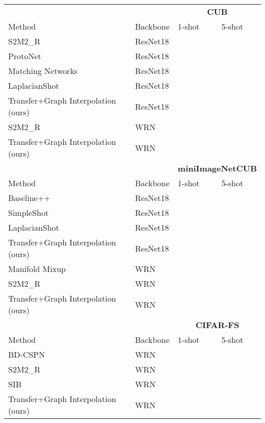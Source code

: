 \documentclass[a4paper,conference]{IEEEtran}
\begin{document}
\begin{table*}
{\begin{tabular}{l|l|l|l}
         \toprule
         &          & \multicolumn{2}{c}{\textbf{CUB}} \\
         Method & Backbone & 1-shot & 5-shot \\       
         \midrule
S2M2\_R~\cite{mangla2020charting} & ResNet18 &  & \\
         ProtoNet~\cite{snell2017prototypical} & ResNet18 &  & \\
         Matching Networks~\cite{vinyals2016matching} & ResNet18 &  & \\ 
         LaplacianShot~\cite{ziko2020laplacian} & ResNet18 &  & \\
         Transfer+Graph Interpolation (ours) & ResNet18 &  & \\
         \midrule
         S2M2\_R~\cite{mangla2020charting} & WRN &  & \\
         Transfer+Graph Interpolation (ours) & WRN &  & \\
         \bottomrule
         
         \toprule
         &          & \multicolumn{2}{c}{\textbf{miniImageNet}\textbf{CUB}} \\
         Method & Backbone & 1-shot & 5-shot \\
         \midrule
         Baseline++~\cite{chen2019closer} & ResNet18 &  & \\
         SimpleShot~\cite{wang2019simpleshot} & ResNet18 &  & \\
         LaplacianShot~\cite{ziko2020laplacian} & ResNet18 &  & \\
         Transfer+Graph Interpolation (ours) & ResNet18 &  & \\
         \midrule
         Manifold Mixup~\cite{verma2018manifold} & WRN &  & \\
         S2M2\_R~\cite{mangla2020charting} & WRN &  & \\
         Transfer+Graph Interpolation (ours) & WRN &  & \\
         \bottomrule
         
         \toprule
         &          & \multicolumn{2}{c}{\textbf{CIFAR-FS}} \\
         Method & Backbone & 1-shot & 5-shot \\
         \midrule
BD-CSPN~\cite{liu2019prototype} & WRN &  & \\
         S2M2\_R~\cite{mangla2020charting} & WRN &  & \\
         SIB~\cite{hu2020empirical} & WRN &  & \\
         Transfer+Graph Interpolation (ours) & WRN &  & \\
         \bottomrule
         
    \end{tabular}
    }
    \label{tab:results}
\end{table*}
\end{document}
